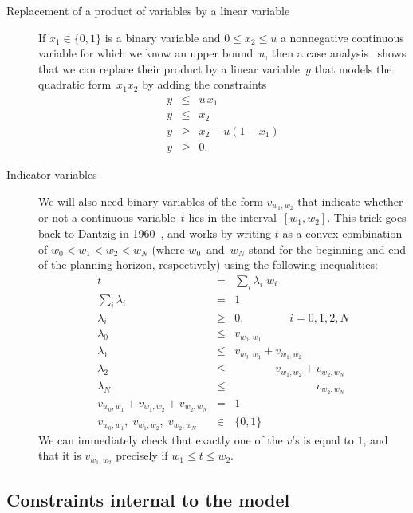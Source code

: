 \documentclass[11pt,reqno]{amsart}
\numberwithin{equation}{section}
\begin{document}
\begin{description}
\item[Replacement of a product of variables by a linear variable] If $x_1\in\{0,1\}$ is a
  binary variable and $0\le x_2\le u$ a nonnegative continuous variable for which we know
  an upper bound~$u$, then a case analysis~\cite[Chapter~7]{aimms} shows that we can
  replace their product by a linear variable~$y$ that models the quadratic form~$x_1x_2$
  by adding the constraints
  \begin{eqnarray*}
    y &\le& u\, x_1 \\
    y &\le& x_2 \\
    y &\ge& x_2 - u(1-x_1) \\
    y &\ge& 0.
  \end{eqnarray*}

\item[Indicator variables] We will also need binary variables of the form $v_{w_1,w_2}$
  that indicate whether or not a continuous variable~$t$ lies in the
  interval~$[w_1,w_2]$. This trick goes back to Dantzig in 1960~\cite{dantzig60}, and
  works by writing $t$ as a convex combination of $w_0<w_1<w_2<w_N$ (where $w_0$~and~$w_N$
  stand for the beginning and end of the planning horizon, respectively) using the
  following inequalities:
  \begin{eqnarray*}
    t &=& \sum_i \lambda_i\; w_i\\
    \sum_i \lambda_i &=& 1\\
    \lambda_i &\ge& 0, \qquad\qquad i=0,1,2,N\\
    \lambda_0 &\le& v_{w_0,w_1}\\
    \lambda_1 &\le& v_{w_0,w_1} + v_{w_1,w_2}\\
    \lambda_2 &\le& \phantom{v_{w_0,w_1} +{}}v_{w_1,w_2} + v_{w_2,w_N}\\
    \lambda_N &\le& \phantom{v_{w_0,w_1} + v_{w_1,w_2}+{}}v_{w_2,w_N}\\
    v_{w_0,w_1} + v_{w_1,w_2} + v_{w_2,w_N} &=& 1\\
    v_{w_0,w_1},\; v_{w_1,w_2},\; v_{w_2,w_N} &\in& \{0,1\}
  \end{eqnarray*}
  We can immediately check that exactly one of the $v$'s is equal to $1$, and that it is
  $v_{w_1,w_2}$ precisely if $w_1\le t\le w_2$.
\end{description}

\subsection{Constraints internal to the model}
\end{document}
